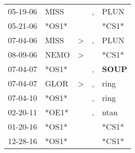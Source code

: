\begin{supertabular}{p{0.07\textwidth}p{0.06\textwidth}p{0.02\textwidth}p{0.02\textwidth}p{0.06\textwidth}}
 05-19-06\textsuperscript{} &  MISS\textsuperscript{} &               &  , &           PLUN\textsuperscript{} \\
 05-21-06\textsuperscript{} &                   *OS1* &               &    &                            *CS1* \\
 07-04-06\textsuperscript{} &  MISS\textsuperscript{} &  \textgreater &  , &           PLUN\textsuperscript{} \\
 08-09-06\textsuperscript{} &  NEMO\textsuperscript{} &  \textgreater &    &                            *CS1* \\
 07-04-07\textsuperscript{} &                   *OS1* &               &  , &  \textbf{SOUP\textsuperscript{}} \\
 07-04-07\textsuperscript{} &  GLOR\textsuperscript{} &  \textgreater &  , &           ring\textsuperscript{} \\
 07-04-10\textsuperscript{} &                   *OS1* &               &  , &           ring\textsuperscript{} \\
 02-20-11\textsuperscript{} &                   *OE1* &               &  , &           ntan\textsuperscript{} \\
 01-20-16\textsuperscript{} &                   *OS1* &               &    &                            *CS1* \\
 12-28-16\textsuperscript{} &                   *OS1* &               &    &                            *CS1* \\
\end{supertabular}
